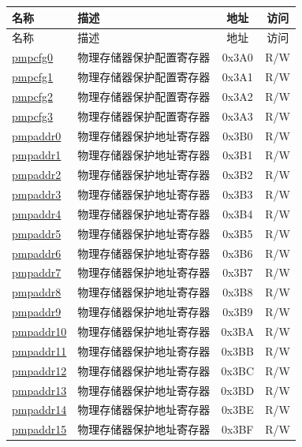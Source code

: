 
\begin{longtable}{ | p{4.0cm} | p{8.4cm} | c | c| }
\hline\rowcolor{lightgray}
名称 & 描述 & 地址 & 访问 \\ \hline
\endfirsthead
\hline
\rowcolor{lightgray}
名称 & 描述 & 地址 & 访问  \\
\hline
\endhead
\endfoot

\hyperref[sec:riscvcpu-pmp-reg-desc]{pmpcfg0} & 物理存储器保护配置寄存器 & 0x3A0 & R/W \\\hline
\hyperref[sec:riscvcpu-pmp-reg-desc]{pmpcfg1} & 物理存储器保护配置寄存器 & 0x3A1 & R/W \\\hline
\hyperref[sec:riscvcpu-pmp-reg-desc]{pmpcfg2} & 物理存储器保护配置寄存器 & 0x3A2 & R/W \\\hline
\hyperref[sec:riscvcpu-pmp-reg-desc]{pmpcfg3} & 物理存储器保护配置寄存器 & 0x3A3 & R/W \\\hline
\hyperref[sec:riscvcpu-pmp-reg-desc]{pmpaddr0} & 物理存储器保护地址寄存器 & 0x3B0 & R/W \\\hline
\hyperref[sec:riscvcpu-pmp-reg-desc]{pmpaddr1} & 物理存储器保护地址寄存器 & 0x3B1 & R/W \\\hline
\hyperref[sec:riscvcpu-pmp-reg-desc]{pmpaddr2} & 物理存储器保护地址寄存器 & 0x3B2 & R/W \\\hline
\hyperref[sec:riscvcpu-pmp-reg-desc]{pmpaddr3} & 物理存储器保护地址寄存器 & 0x3B3 & R/W \\\hline
\hyperref[sec:riscvcpu-pmp-reg-desc]{pmpaddr4} & 物理存储器保护地址寄存器 & 0x3B4 & R/W \\\hline
\hyperref[sec:riscvcpu-pmp-reg-desc]{pmpaddr5} & 物理存储器保护地址寄存器 & 0x3B5 & R/W \\\hline
\hyperref[sec:riscvcpu-pmp-reg-desc]{pmpaddr6} & 物理存储器保护地址寄存器 & 0x3B6 & R/W \\\hline
\hyperref[sec:riscvcpu-pmp-reg-desc]{pmpaddr7} & 物理存储器保护地址寄存器 & 0x3B7 & R/W \\\hline
\hyperref[sec:riscvcpu-pmp-reg-desc]{pmpaddr8} & 物理存储器保护地址寄存器 & 0x3B8 & R/W \\\hline
\hyperref[sec:riscvcpu-pmp-reg-desc]{pmpaddr9} & 物理存储器保护地址寄存器 & 0x3B9 & R/W \\\hline
\hyperref[sec:riscvcpu-pmp-reg-desc]{pmpaddr10} & 物理存储器保护地址寄存器 & 0x3BA & R/W \\\hline
\hyperref[sec:riscvcpu-pmp-reg-desc]{pmpaddr11} & 物理存储器保护地址寄存器 & 0x3BB & R/W \\\hline
\hyperref[sec:riscvcpu-pmp-reg-desc]{pmpaddr12} & 物理存储器保护地址寄存器 & 0x3BC & R/W \\\hline
\hyperref[sec:riscvcpu-pmp-reg-desc]{pmpaddr13} & 物理存储器保护地址寄存器 & 0x3BD & R/W \\\hline
\hyperref[sec:riscvcpu-pmp-reg-desc]{pmpaddr14} & 物理存储器保护地址寄存器 & 0x3BE & R/W \\\hline
\hyperref[sec:riscvcpu-pmp-reg-desc]{pmpaddr15} & 物理存储器保护地址寄存器 & 0x3BF & R/W \\\hline

\end{longtable}
